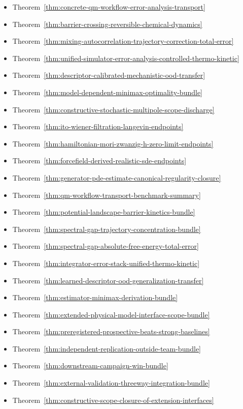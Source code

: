 \begin{itemize}
\item Theorem~\ref{thm:concrete-qm-workflow-error-analysis-transport}
\item Theorem~\ref{thm:barrier-crossing-reversible-chemical-dynamics}
\item Theorem~\ref{thm:mixing-autocorrelation-trajectory-correction-total-error}
\item Theorem~\ref{thm:unified-simulator-error-analysis-controlled-thermo-kinetic}
\item Theorem~\ref{thm:descriptor-calibrated-mechanistic-ood-transfer}
\item Theorem~\ref{thm:model-dependent-minimax-optimality-bundle}
\item Theorem~\ref{thm:constructive-stochastic-multipole-scope-discharge}
\item Theorem~\ref{thm:ito-wiener-filtration-langevin-endpoints}
\item Theorem~\ref{thm:hamiltonian-mori-zwanzig-h-zero-limit-endpoints}
\item Theorem~\ref{thm:forcefield-derived-realistic-sde-endpoints}
\item Theorem~\ref{thm:generator-pde-estimate-canonical-regularity-closure}
\item Theorem~\ref{thm:qm-workflow-transport-benchmark-summary}
\item Theorem~\ref{thm:potential-landscape-barrier-kinetics-bundle}
\item Theorem~\ref{thm:spectral-gap-trajectory-concentration-bundle}
\item Theorem~\ref{thm:spectral-gap-absolute-free-energy-total-error}
\item Theorem~\ref{thm:integrator-error-stack-unified-thermo-kinetic}
\item Theorem~\ref{thm:learned-descriptor-ood-generalization-transfer}
\item Theorem~\ref{thm:estimator-minimax-derivation-bundle}
\item Theorem~\ref{thm:extended-physical-model-interface-scope-bundle}
\item Theorem~\ref{thm:preregistered-prospective-beats-strong-baselines}
\item Theorem~\ref{thm:independent-replication-outside-team-bundle}
\item Theorem~\ref{thm:downstream-campaign-win-bundle}
\item Theorem~\ref{thm:external-validation-threeway-integration-bundle}
\item Theorem~\ref{thm:constructive-scope-closure-of-extension-interfaces}

\end{itemize}
